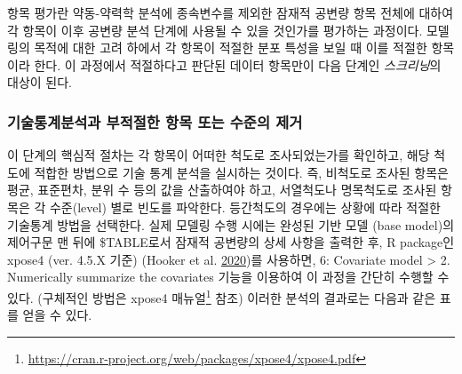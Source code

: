 \documentclass[
  10pt,
  krantz2,
  a4paper]{krantz}
\theoremstyle{definition}
\theoremstyle{definition}
\theoremstyle{definition}
\theoremstyle{remark}
\begin{document}
항목 평가란 약동-약력학 분석에 종속변수를 제외한 잠재적 공변량 항목 전체에 대하여 각 항목이 이후 공변량 분석 단계에 사용될 수 있을 것인가를 평가하는 과정이다. 모델링의 목적에 대한 고려 하에서 각 항목이 적절한 분포 특성을 보일 때 이를 적절한 항목이라 한다. 이 과정에서 적절하다고 판단된 데이터 항목만이 다음 단계인 \emph{스크리닝}의 대상이 된다.

\hypertarget{uxae30uxc220uxd1b5uxacc4uxbd84uxc11duxacfc-uxbd80uxc801uxc808uxd55c-uxd56duxbaa9-uxb610uxb294-uxc218uxc900uxc758-uxc81cuxac70}{%
\subsubsection{기술통계분석과 부적절한 항목 또는 수준의 제거}\label{uxae30uxc220uxd1b5uxacc4uxbd84uxc11duxacfc-uxbd80uxc801uxc808uxd55c-uxd56duxbaa9-uxb610uxb294-uxc218uxc900uxc758-uxc81cuxac70}}

이 단계의 핵심적 절차는 각 항목이 어떠한 척도로 조사되었는가를 확인하고, 해당 척도에 적합한 방법으로 기술 통계 분석을 실시하는 것이다. 즉, 비척도로 조사된 항목은 평균, 표준편차, 분위 수 등의 값을 산출하여야 하고, 서열척도나 명목척도로 조사된 항목은 각 수준(level) 별로 빈도를 파악한다. 등간척도의 경우에는 상황에 따라 적절한 기술통계 방법을 선택한다. 실제 모델링 수행 시에는 완성된 기반 모델 (base model)의 제어구문 맨 뒤에 \$TABLE로서 잠재적 공변량의 상세 사항을 출력한 후, R package인 xpose4 (ver. 4.5.X 기준) (Hooker et al. \protect\hyperlink{ref-R-xpose4}{2020})를 사용하면, 6: Covariate model \textgreater{} 2. Numerically summarize the covariates 기능을 이용하여 이 과정을 간단히 수행할 수 있다. (구체적인 방법은 xpose4 매뉴얼\footnote{\url{https://cran.r-project.org/web/packages/xpose4/xpose4.pdf}} 참조) 이러한 분석의 결과로는 다음과 같은 표를 얻을 수 있다.
\end{document}
